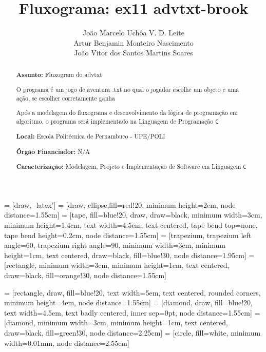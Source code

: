 \documentclass[a4paper,12pt]{article} %
\title{Fluxograma: ex11 advtxt-brook}
\author{João Marcelo Uchôa V. D. Leite \\ Artur Benjamin Monteiro Nascimento\\ João Vitor dos Santos Martins Soares}
\begin{document}
\maketitle


 = [draw, -latex']
 = [draw, ellipse,fill=red!20, minimum height=2em, node distance=1.55cm]
 = [tape, fill=blue!20, draw, draw=black, minimum width=3cm, minimum height=1.4cm, text width=4.5em, text centered, tape bend top=none, tape bend height=0.2cm, node distance=1.55cm]
 = [trapezium, trapezium left angle=60, trapezium right angle=90, minimum width=3cm, minimum height=1cm, text centered, draw=black, fill=blue!30, node distance=1.95cm]
 = [rectangle, minimum width=3cm, minimum height=1cm, text centered, draw=black, fill=orange!30, node distance=1.55cm]

 = [rectangle, draw, fill=blue!20, text width=5em, text centered, rounded corners, minimum height=4em, node distance=1.55cm]
 = [diamond, draw, fill=blue!20, text width=4.5em, text badly centered, inner sep=0pt, node distance=1.55cm]
 = [diamond, minimum width=3cm, minimum height=1cm, text centered, draw=black, fill=green!30, node distance=2.25cm]
 = [circle, fill=white, minimum width=0.01mm, node distance=2.55cm]


\begin{abstract}

\textbf{Assunto:} Fluxogram do advtxt


O programa é um jogo de aventura .txt no qual o jogador escolhe um objeto e uma ação, se escolher corretamente ganha

Após a modelagem do fluxograma e desenvolvimento da lógica de programação em algoritmo,
o programa será implementado na Linguagem de Programação \texttt{C}


\textbf{Local:} Escola Politécnica de Pernambuco - UPE/POLI

\textbf{Órgão Financiador:} N/A

\textbf{Caracterização:} Modelagem, Projeto e Implementação de Software em Linguagem \texttt{C}


\end{abstract}
\end{document}
